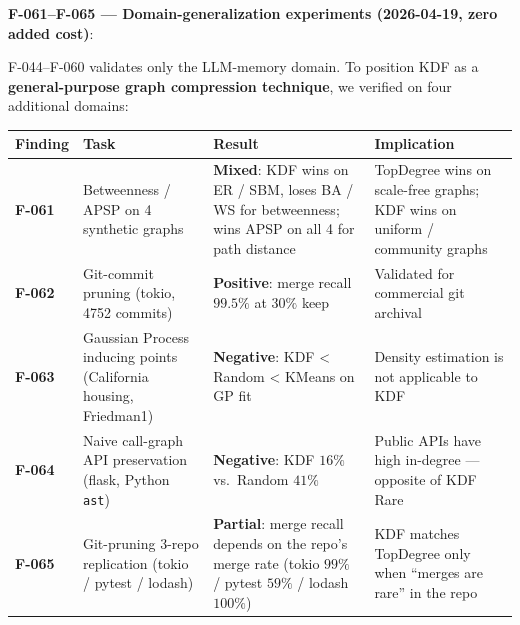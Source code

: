 \textbf{F-061--F-065 --- Domain-generalization experiments (2026-04-19, zero added cost)}:

F-044--F-060 validates only the LLM-memory domain. To position KDF as a \textbf{general-purpose graph compression technique}, we verified on four additional domains:

{\def\LTcaptype{none} %
\begin{longtable}[]{@{}
  >{\raggedright\arraybackslash}p{}
  >{\raggedright\arraybackslash}p{}
  >{\raggedright\arraybackslash}p{}
  >{\raggedright\arraybackslash}p{}@{}}
\toprule\noalign{}
\begin{minipage}[b]{\linewidth}\raggedright
Finding
\end{minipage} & \begin{minipage}[b]{\linewidth}\raggedright
Task
\end{minipage} & \begin{minipage}[b]{\linewidth}\raggedright
Result
\end{minipage} & \begin{minipage}[b]{\linewidth}\raggedright
Implication
\end{minipage} \\
\midrule\noalign{}
\endhead
\bottomrule\noalign{}
\endlastfoot
\textbf{F-061} & Betweenness / APSP on 4 synthetic graphs & \textbf{Mixed}: KDF wins on ER / SBM, loses BA / WS for betweenness; wins APSP on all 4 for path distance & TopDegree wins on scale-free graphs; KDF wins on uniform / community graphs \\
\textbf{F-062} & Git-commit pruning (tokio, 4752 commits) & \textbf{Positive}: merge recall \(99.5\%\) at \(30\%\) keep & Validated for commercial git archival \\
\textbf{F-063} & Gaussian Process inducing points (California housing, Friedman1) & \textbf{Negative}: KDF \textless{} Random \textless{} KMeans on GP fit & Density estimation is not applicable to KDF \\
\textbf{F-064} & Naive call-graph API preservation (flask, Python \texttt{ast}) & \textbf{Negative}: KDF \(16\%\) vs.~Random \(41\%\) & Public APIs have high in-degree --- opposite of KDF Rare \\
\textbf{F-065} & Git-pruning 3-repo replication (tokio / pytest / lodash) & \textbf{Partial}: merge recall depends on the repo's merge rate (tokio \(99\%\) / pytest \(59\%\) / lodash \(100\%\)) & KDF matches TopDegree only when ``merges are rare'' in the repo \\
\end{longtable}
}

